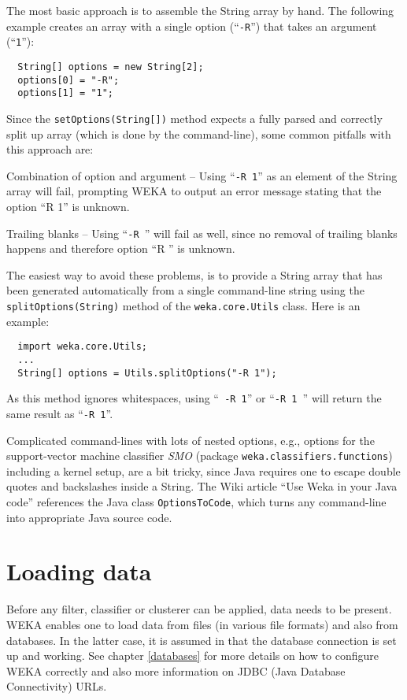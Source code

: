 The most basic approach is to assemble the String array by hand. The following
example creates an array with a single option (``\texttt{-R}'') that takes an
argument (``\texttt{1}''):
\begin{verbatim}
  String[] options = new String[2];
  options[0] = "-R";
  options[1] = "1";
\end{verbatim}
Since the \texttt{setOptions(String[])} method expects a fully parsed and
correctly split up array (which is done by the command-line), some common
pitfalls with this approach are:
\begin{tight_itemize}
	\item Combination of option and argument -- Using ``\texttt{-R 1}'' as an
element of the String array will fail, prompting WEKA to output an error message
stating that the option ``R 1'' is unknown.
	\item Trailing blanks -- Using ``\texttt{-R }'' will fail as well, since no
removal of trailing blanks happens and therefore option ``R '' is unknown.
\end{tight_itemize}
The easiest way to avoid these problems, is to provide a String array that has
been generated automatically from a single command-line string using the
\texttt{splitOptions(String)} method of the \texttt{weka.core.Utils} class.
Here is an example:
\begin{verbatim}
  import weka.core.Utils;
  ...
  String[] options = Utils.splitOptions("-R 1");
\end{verbatim}
As this method ignores whitespaces, using ``\texttt{  -R    1}'' or
``\texttt{-R 1 }'' will return the same result as ``\texttt{-R 1}''.

Complicated command-lines with lots of nested options, e.g., options for the
support-vector machine classifier \textit{SMO} (package
\texttt{weka.classifiers.functions}) including a kernel setup, are a bit tricky,
since Java requires one to escape double quotes and backslashes inside a
String. The Wiki\cite{wekawiki} article ``Use Weka in your Java code''
references the Java class \texttt{OptionsToCode}, which turns any command-line
into appropriate Java source code.

\newpage

\section{Loading data}
\label{api_loading_data}
Before any filter, classifier or clusterer can be applied, data needs to be
present. WEKA enables one to load data from files (in various file formats) and
also from databases. In the latter case, it is assumed in that the database
connection is set up and working. See chapter \ref{databases} for more details
on how to configure WEKA correctly and also more information on JDBC (Java
Database Connectivity) URLs.

